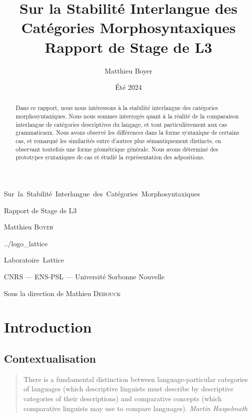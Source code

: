 \documentclass{cours}
\title{Sur la Stabilité Interlangue des Catégories Morphosyntaxiques\\[2pt]\small Rapport de Stage de L3}
\author{Matthieu Boyer}
\date{Été 2024}
\begin{document}
\titlepage %
	{}
	{\centering %
		{\Huge Sur\, la\, Stabilité\, Interlangue\, des\, Catégories\, Morphosyntaxiques\par}
                \vspace{16pt}
                {\Large Rapport de Stage de L3\par}
                \vspace{24pt}
                {\huge Matthieu \textsc{Boyer}\par}}
	{../logo_lattice}
	{\centering %
                {\huge\sc Laboratoire\, Lattice \par}
                \vspace{16pt}
                {\large \sc CNRS --- ENS-PSL --- Université Sorbonne Nouvelle\par}
                \vspace{24pt}
		{\Large Sous la direction de Mathieu \textsc{Dehouck}\par}}

\tableofcontents

\begin{abstract}
Dans ce rapport, nous nous intéressons à la stabilité interlangue des catégories morphosyntaxiques.
Nous nous sommes interrogés quant à la réalité de la comparaison interlangue de catégories descriptives du langage, et tout particulièrement aux cas grammaticaux.
Nous avons observé les différences dans la forme syntaxique de certains cas, et remarqué les similarités entre d'autres plus sémantiquement distincts, en observant toutefois une forme géométrique générale.
Nous avons déterminé des prototypes syntaxiques de cas et étudié la représentation des adpositions.
\end{abstract}


\section{Introduction}\label{sec:introduction}
\subsection{Contextualisation}\label{subsec:contextualisation}
\begin{quote}
	There is a fundamental distinction between language-particular categories of languages (which descriptive linguists must describe by descriptive categories of their descriptions) and comparative concepts (which comparative linguists may use to compare languages).
	{\flushright \textit{Martin Haspelmath} \cite{Has18}}
\end{quote}
\end{document}
